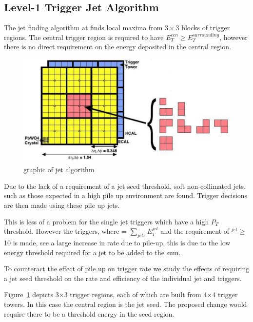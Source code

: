 \subsection{Level-1 Trigger Jet Algorithm} %
\label{sec:Level-1 Trigger Jet Algorythm}
The jet finding algorithm \cite{gctcomm} at \Lone finds local maxima from $3\times3$ blocks
of trigger regions. The central trigger region
is required to have $E_{T}^{cen} \geq E_{T}^{surrounding}$, however there is no direct
requirement on the energy deposited in the central region.

\begin{figure}[htbp]
  \centering
    \includegraphics[width=\textwidth]{generated/LoneTrigger/level1jetalgo.pdf}
  \caption{graphic of \Lone jet algorithm}
  \label{fig:figures_level1jetalgo}
\end{figure}


Due to the lack of a requirement of a jet seed threshold, soft non-collimated jets, such as
those expected in a high pile up environment are found. Trigger decisions are then made using these pile up jets.

This is less of a problem for the single jet triggers which have a high $P_{T}$ threshold.
However the \HT triggers, where \HT = $\sum_{jets}E_{T}^{jet}$ and the requirement of \ET$^{jet} \geq $10 \GeV is made,
see a large increase in rate due to pile-up, this is due to the low energy threshold required for a jet to be added to the \HT sum.

To counteract the effect of pile up on trigger rate we study the effects of requiring a jet
seed threshold on the rate and efficiency of the individual jet and \HT triggers.

Figure~\ref{fig:figures_level1jetalgo} depicts 3$\times$3 trigger regions, each of which are built from 4$\times$4 trigger towers.
In this case the central region is the jet seed. The proposed change would require there to be a threshold energy in the seed
region.

